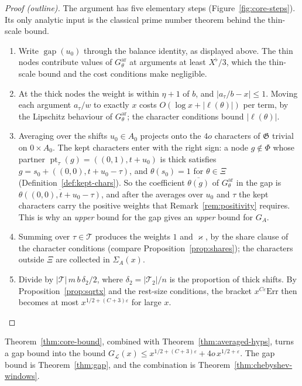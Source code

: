\documentclass[11pt]{amsbook}
\theoremstyle{plain}
\theoremstyle{definition}
\theoremstyle{remark}
\numberwithin{equation}{section}
\numberwithin{figure}{chapter}
\numberwithin{table}{chapter}
\newcommand{\eps}{\varepsilon}
\newcommand{\lev}{\mathscr{L}}
\newcommand{\GG}{\mathfrak{G}}
\newcommand{\pt}{\operatorname{pt}}
\newcommand{\GPsi}{G^{\mathrm{ar}}}
\newcommand{\Top}{\mathcal{T}}
\newcommand{\gap}{\operatorname{gap}}
\newcommand{\Err}{\mathrm{Err}}
\begin{document}
\begin{proof}[Proof (outline)]
The argument has five elementary steps (Figure~\ref{fig:core-steps}). Its only analytic input is
the classical prime number theorem behind the thin-scale bound.
\begin{enumerate}[label=(\arabic*)]
\item Write $\gap(u_0)$ through the balance identity, as displayed
above. The thin nodes contribute values of $\GPsi_\theta$ at
arguments at least $X^\flat/3$, which the thin-scale bound and the
cost conditions make negligible.
\item At the thick nodes the weight is within $\eta+1$ of $b$, and
$|a_\tau/b-x|\le1$. Moving each argument $a_\tau/w$ to exactly $x$
costs $O(\log x+|\ell(\theta)|)$ per term, by the Lipschitz behaviour
of $\GPsi_\theta$; the character conditions bound $|\ell(\theta)|$.
\item Averaging over the shifts $u_0\in A_0$ projects onto the $4o$
characters of $\GG$ trivial on $0\times A_0$. The kept characters
enter with the right sign: a node $g\notin\Phi$ whose partner
$\pt_\tau(g)=((0,1),t+u_0)$ is thick satisfies
$g=s_0+((0,0),t+u_0-\tau)$, and $\theta(s_0)=1$ for $\theta\in\Xi$
(Definition~\ref{def:kept-chars}). So the coefficient
$\overline{\theta(g)}$ of $\GPsi_\theta$ in the gap is
$\overline{\theta((0,0),t+u_0-\tau)}$, and after the averages over
$u_0$ and $\tau$ the kept characters carry the positive weights that
Remark~\ref{rem:positivity} requires. This is why an \emph{upper}
bound for the gap gives an \emph{upper} bound for $G_A$.
\item Summing over $\tau\in\Top$ produces the weights $1$ and $\varkappa$, by
the share clause of the character conditions
(compare Proposition~\ref{prop:shares}); the characters outside $\Xi$
are collected in $\Sigma_A(x)$.
\item Divide by $|\Top|\,m\,b\,\delta_2/2$, where
$\delta_2=|\Top_2|/n$ is the proportion of thick shifts. By
Proposition~\ref{prop:sqrtx} and the rest-size conditions, the
bracket $x^{C\eps}\Err$ then becomes at most $x^{1/2+(C+3)\eps}$ for
large $x$.
\end{enumerate}
\end{proof}

\noindent Theorem~\ref{thm:core-bound}, combined with
Theorem~\ref{thm:averaged-hyps}, turns a gap bound into the bound
$G_\lev(x)\le x^{1/2+(C+3)\eps}+4o\,x^{1/2+\eps}$. The gap bound is
Theorem~\ref{thm:gap}, and the combination is
Theorem~\ref{thm:chebyshev-windows}.
\begin{figure}[tbp]
\centering

\end{figure}
\end{document}
